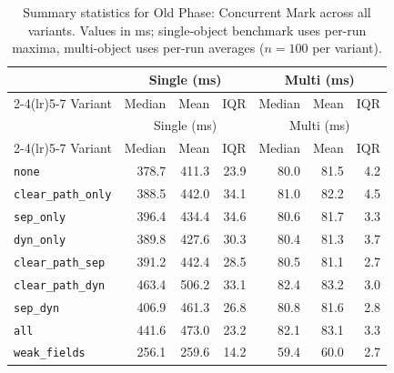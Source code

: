 \begin{longtable}[c]{l rrr rrr}
\caption[Old Phase: Concurrent Mark summary statistics]{Summary statistics for Old Phase: Concurrent Mark across all variants. Values in ms; single-object benchmark uses per-run maxima, multi-object uses per-run averages ($n=100$ per variant).}\label{tab:stats-old-concurrent-mark} \\
\toprule
 & \multicolumn{3}{c}{Single (ms)} & \multicolumn{3}{c}{Multi (ms)} \\
\cmidrule(lr){2-4}\cmidrule(lr){5-7}
Variant & Median & Mean & IQR & Median & Mean & IQR \\
\midrule
\endfirsthead
\toprule
 & \multicolumn{3}{c}{Single (ms)} & \multicolumn{3}{c}{Multi (ms)} \\
\cmidrule(lr){2-4}\cmidrule(lr){5-7}
Variant & Median & Mean & IQR & Median & Mean & IQR \\
\midrule
\endhead
\bottomrule
\endfoot
\texttt{none} & 378.7 & 411.3 & 23.9 & 80.0 & 81.5 & 4.2 \\
\texttt{clear\_path\_only} & 388.5 & 442.0 & 34.1 & 81.0 & 82.2 & 4.5 \\
\texttt{sep\_only} & 396.4 & 434.4 & 34.6 & 80.6 & 81.7 & 3.3 \\
\texttt{dyn\_only} & 389.8 & 427.6 & 30.3 & 80.4 & 81.3 & 3.7 \\
\texttt{clear\_path\_sep} & 391.2 & 442.4 & 28.5 & 80.5 & 81.1 & 2.7 \\
\texttt{clear\_path\_dyn} & 463.4 & 506.2 & 33.1 & 82.4 & 83.2 & 3.0 \\
\texttt{sep\_dyn} & 406.9 & 461.3 & 26.8 & 80.8 & 81.6 & 2.8 \\
\texttt{all} & 441.6 & 473.0 & 23.2 & 82.1 & 83.1 & 3.3 \\
\texttt{weak\_fields} & 256.1 & 259.6 & 14.2 & 59.4 & 60.0 & 2.7 \\
\end{longtable}
